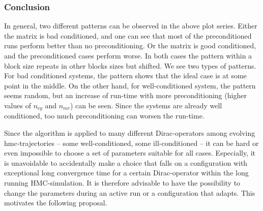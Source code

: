 \documentclass{article}
\theoremstyle{plain} %
\theoremstyle{convention} %
\theoremstyle{remark} %
\numberwithin{equation}{section}
\begin{document}
\subsubsection{Conclusion}

In general, two different patterns can be observed in the above plot series. Either the matrix is bad conditioned, and one can see that most of the preconditioned runs perform better than no preconditioning. Or the matrix is good conditioned, and the preconditioned cases perform worse. In both cases the pattern within a block size repeats in other blocks sizes but shifted. We see two types of patterns. For bad conditioned systems, the pattern shows that the ideal case is at some point in the middle. On the other hand, for well-conditioned system, the pattern seems random, but an increase of run-time with more preconditioning (higher values of $n_{cy}$ and $n_{mr}$) can be seen. Since the systems are already well conditioned, too much preconditioning can worsen the run-time.


Since the algorithm is applied to many different Dirac-operators among evolving \acrshort{hmc}-trajectories -- some well-conditioned, some ill-conditioned -- it can be hard or even impossible to choose a set of parameters suitable for all cases. Especially, it is unavoidable to accidentally make a choice that falls on a configuration with exceptional long convergence time for a certain Dirac-operator within the long running HMC-simulation. It is therefore advisable to have the possibility to change the parameters during an active run or a configuration that adapts. This motivates the following proposal.
\end{document}
